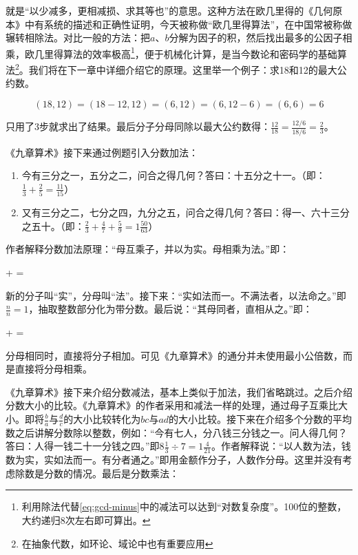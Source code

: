 \documentclass[b5paper]{ctexart}
\begin{document}
就是“以少减多，更相减损、求其等也”的意思。这种方法在欧几里得的《几何原本》中有系统的描述和正确性证明，今天被称做“欧几里得算法”，在中国常被称做辗转相除法。对比一般的方法：把$a$、$b$分解为因子的积，然后找出最多的公因子相乘，欧几里得算法的效率极高\footnote{利用除法代替\cref{eq:gcd-minus}中的减法可以达到“对数复杂度”。100位的整数，大约递归8次左右即可算出。}，便于机械化计算，是当今数论和密码学的基础算法\footnote{在抽象代数，如环论、域论中也有重要应用}。我们将在下一章中详细介绍它的原理。这里举一个例子：求18和12的最大公约数。

\[
(18, 12) = (18 - 12, 12) = (6, 12) = (6, 12 - 6) = (6, 6) = 6
\]

只用了3步就求出了结果。最后分子分母同除以最大公约数得：$\frac{12}{18} = \frac{12/6}{18/6} = \frac{2}{3}$。

《九章算术》接下来通过例题引入分数加法：

\begin{enumerate}[1)]
\item 今有三分之一，五分之二，问合之得几何？答曰：十五分之十一。（即：$\frac{1}{3} + \frac{2}{5} = \frac{11}{15}$）
\item 又有三分之二，七分之四，九分之五，问合之得几何？答曰：得一、六十三分之五十。（即：$\frac{2}{3} + \frac{4}{7} + \frac{5}{9} = 1\frac{50}{63}$）
\end{enumerate}

作者解释分数加法原理：“母互乘子，并以为实。母相乘为法。”即：

\be
{} +  = 
\ee

新的分子叫“实”，分母叫“法”。接下来：“实如法而一。不满法者，以法命之。”即$\frac{n}{n} = 1$，抽取整数部分化为带分数。最后说：“其母同者，直相从之。”即：

\be
{} +  = 
\ee

分母相同时，直接将分子相加。可见《九章算术》的通分并未使用最小公倍数，而是直接将分母相乘。

《九章算术》接下来介绍分数减法，基本上类似于加法，我们省略跳过。之后介绍分数大小的比较。《九章算术》的作者采用和减法一样的处理，通过母子互乘比大小。即将$\frac{b}{a}$与$\frac{d}{c}$的大小比较转化为$bc$与$ad$的大小比较。接下来在介绍多个分数的平均数之后讲解分数除以整数，例如：“今有七人，分八钱三分钱之一。问人得几何？答曰：人得一钱二十一分钱之四。”即$8\frac{1}{3} \div 7 = 1\frac{4}{21}$。作者解释说：“以人数为法，钱数为实，实如法而一。有分者通之。”即用金额作分子，人数作分母。这里并没有考虑除数是分数的情况。最后是分数乘法：
\end{document}

